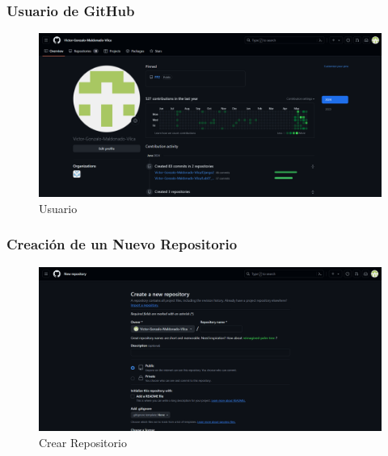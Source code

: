 \documentclass{article}
\begin{document}

	\subsubsection{Usuario de GitHub}
  \begin{figure}[H]
    \centering
    \includegraphics[width=1\textwidth, keepaspectratio]{img/usuario.png}
    \caption{Usuario}
  \end{figure}
  

  \subsubsection{Creación de un Nuevo Repositorio}
  \begin{figure}[H]
    \centering
    \includegraphics[width=1\textwidth, keepaspectratio]{img/crearRepo.png}
    \caption{Crear Repositorio}
  \end{figure}
  
  
  
\end{document}
